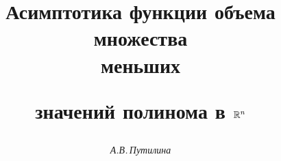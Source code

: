 




% 





\newcommand{\res}{\operatorname{res}}


\newcommand{\Bet}{\operatorname{B}}


\newcommand{\Gam}{\Gamma}


\newcommand{\I}{\cal I}


\newcommand{\J}{\cal J}


\newcommand{\D}{\cal D}


\newcommand{\tts}[1]{}







\setcounter{page}{16}















\author{\it А.В.\,Путилина}




\title{Асимптотика функции объема множества\\ меньших


значений полинома в $\Bbb R^n$}





\date{}




\pagestyle{plain} %







